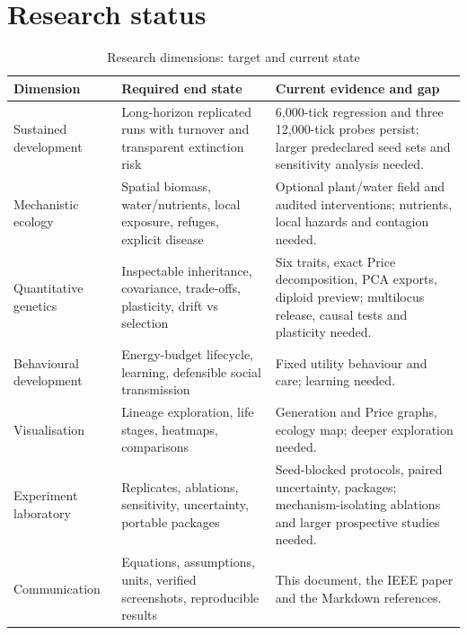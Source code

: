 \section{Research status}
\begin{longtable}{p{3.2cm}p{5.6cm}p{6.2cm}}
\caption{Research dimensions: target and current state}\\
\toprule
Dimension & Required end state & Current evidence and gap \\
\midrule
\endfirsthead
Sustained development & Long-horizon replicated runs with turnover and transparent extinction risk & 6{,}000-tick regression and three 12{,}000-tick probes persist; larger predeclared seed sets and sensitivity analysis needed. \\
Mechanistic ecology & Spatial biomass, water/nutrients, local exposure, refuges, explicit disease & Optional plant/water field and audited interventions; nutrients, local hazards and contagion needed. \\
Quantitative genetics & Inspectable inheritance, covariance, trade-offs, plasticity, drift vs selection & Six traits, exact Price decomposition, PCA exports, diploid preview; multilocus release, causal tests and plasticity needed. \\
Behavioural development & Energy-budget lifecycle, learning, defensible social transmission & Fixed utility behaviour and care; learning needed. \\
Visualisation & Lineage exploration, life stages, heatmaps, comparisons & Generation and Price graphs, ecology map; deeper exploration needed. \\
Experiment laboratory & Replicates, ablations, sensitivity, uncertainty, portable packages & Seed-blocked protocols, paired uncertainty, packages; mechanism-isolating ablations and larger prospective studies needed. \\
Communication & Equations, assumptions, units, verified screenshots, reproducible results & This document, the IEEE paper and the Markdown references. \\
\bottomrule
\end{longtable}


